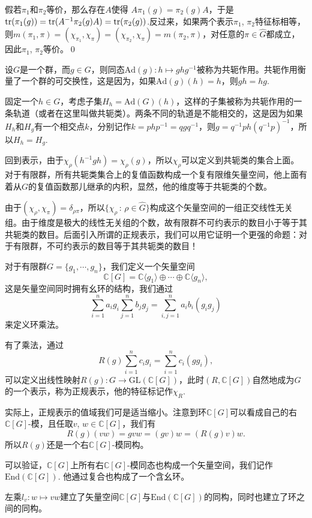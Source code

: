 \documentclass[9pt]{extarticle}
\newcommand{\cc}{\mathbb{C}}
\begin{document}
\proof 假若$\pi_1$和$\pi_2$等价，那么存在$A$使得
$A\pi_1(g)=\pi_2(g)A$，于是$\operatorname{tr}(\pi_1(g))=\operatorname{tr}(A^{-1}\pi_2(g)A)=\operatorname{tr}(\pi_2(g))$.反过来，如果两个表示$\pi_1$, $\pi_2$特征标相等，则$	m(\pi_1,\pi)=(\chi_{\pi_1},\chi_\pi)=(\chi_{\pi_2},\chi_\pi)=m(\pi_2,\pi)$，对任意的$\pi\in\hat{G}$都成立，因此$\pi_1$, $\pi_2$等价。\qed

\para 设$G$是一个群，而$g\in G$，则同态$\mathrm{Ad}(g):h\mapsto ghg^{-1}$被称为共轭作用。共轭作用衡量了一个群的可交换性，这是因为，如果$\mathrm{Ad}(g)(h)=h$，则$gh=hg$.

固定一个$h\in G$，考虑子集$H_h=\mathrm{Ad}(G)(h)$，这样的子集被称为共轭作用的一条轨道（或者在这里叫做共轭类）。两条不同的轨道是不能相交的，这是因为如果$H_h$和$H_g$有一个相交点$k$，分别记作$k=php^{-1}=qgq^{-1}$，则$g=q^{-1}ph(q^{-1}p)^{-1}$，所以$H_h=H_g$.

\para 回到表示，由于$\chi_\rho(h^{-1}gh)= \chi_\rho(g)$，所以$\chi_\rho$可以定义到共轭类的集合上面。对于有限群，所有共轭类集合上的复值函数构成一个复有限维矢量空间，他上面有着从$G$的复值函数那儿继承的内积，显然，他的维度等于共轭类的个数。

由于$(\chi_\rho,\chi_\pi)=\delta_{\rho\pi}$，所以$\{\chi_\rho\,:\, \rho\in \hat{G}\}$构成这个矢量空间的一组正交线性无关组。由于维度是极大的线性无关组的个数，故有限群不可约表示的数目小于等于其共轭类的数目。后面引入所谓的正规表示，我们可以用它证明一个更强的命题：对于有限群，不可约表示的数目等于其共轭类的数目！

\para 对于有限群$G=\{g_1,\cdots,g_n\}$，我们定义一个矢量空间
\[
	\cc [G]=\cc\langle g_1\rangle \oplus \cdots \oplus \cc\langle g_n\rangle,
\]
这是矢量空间同时拥有幺环的结构，我们通过
\[
\sum_{i=1}^n a_i g_i\sum_{j=1}^n b_j g_j=\sum_{i,j=1}^n a_ib_i(g_ig_j)
\]
来定义环乘法。

有了乘法，通过
\[
	R(g)\sum_{i=1}^n c_i g_i=\sum_{i=1}^n c_i(gg_i),
\]
可以定义出线性映射$R(g):G\to \mathrm{GL}(\cc [G])$，此时$(R,\cc [G])$自然地成为$G$的一个表示，称为正规表示，他的特征标记作$\chi_R$. 

实际上，正规表示的值域我们可是适当缩小。注意到环$\cc [G]$可以看成自己的右$\cc [G]$-模，且任取$v$, $w\in \cc [G]$，我们有
\[
	R(g)(vw)=gvw=(gv)w=(R(g)v)w.
\]
所以$R(g)$还是一个右$\cc [G]$-模同构。

可以验证，$\cc [G]$上所有右$\cc [G]$-模同态也构成一个矢量空间，我们记作$\mathrm{End}(\cc [G])$. 他通过复合也构成了一个含幺环。

\pro 左乘$l_v:w\mapsto vw$建立了矢量空间$\cc [G]$与$\mathrm{End}(\cc [G])$的同构，同时也建立了环之间的同构。
\end{document}
